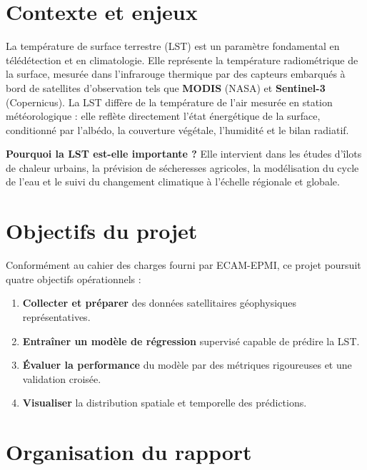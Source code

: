 \documentclass[a4paper,12pt]{report}
\begin{document}
\section{Contexte et enjeux}

La temp\'erature de surface terrestre (LST) est un param\`etre fondamental en t\'el\'ed\'etection et en climatologie. Elle repr\'esente la temp\'erature radiom\'etrique de la surface, mesur\'ee dans l'infrarouge thermique par des capteurs embarqu\'es \`a bord de satellites d'observation tels que \textbf{MODIS} (NASA) et \textbf{Sentinel-3} (Copernicus). La LST diff\`ere de la temp\'erature de l'air mesur\'ee en station m\'et\'eorologique : elle refl\`ete directement l'\'etat \'energ\'etique de la surface, conditionn\'e par l'alb\'edo, la couverture v\'eg\'etale, l'humidit\'e et le bilan radiatif.

\begin{notebox}
\textbf{Pourquoi la LST est-elle importante ?} Elle intervient dans les \'etudes d'îlots de chaleur urbains, la pr\'evision de s\'echeresses agricoles, la mod\'elisation du cycle de l'eau et le suivi du changement climatique \`a l'\'echelle r\'egionale et globale.
\end{notebox}

\section{Objectifs du projet}

Conform\'ement au cahier des charges fourni par ECAM-EPMI, ce projet poursuit quatre objectifs op\'erationnels :

\begin{enumerate}[leftmargin=2em]
  \item \textbf{Collecter et pr\'eparer} des donn\'ees satellitaires g\'eophysiques repr\'esentatives.
  \item \textbf{Entra\^iner un mod\`ele de r\'egression} supervisé capable de pr\'edire la LST.
  \item \textbf{\'Evaluer la performance} du mod\`ele par des m\'etriques rigoureuses et une validation crois\'ee.
  \item \textbf{Visualiser} la distribution spatiale et temporelle des pr\'edictions.
\end{enumerate}

\section{Organisation du rapport}
\end{document}

